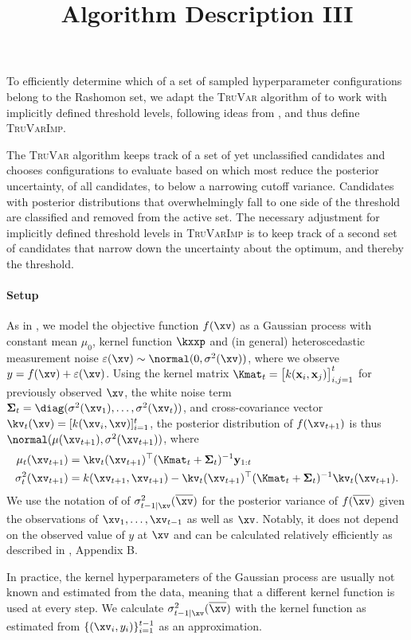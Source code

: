 \documentclass[a4paper,10pt]{article}
\title{Algorithm Description III}
\author{}
\date{}
\newcommand{\TruVar}{\textsc{TruVar}\xspace}
\newcommand{\TruVarImp}{\textsc{TruVarImp}\xspace}
\begin{document}
\maketitle

To efficiently determine which of a set of sampled hyperparameter configurations belong to the Rashomon set, we adapt the \TruVar algorithm of \citet{truvar2024} to work with implicitly defined threshold levels, following ideas from \citet{lse}, and thus define \TruVarImp.

The \TruVar algorithm keeps track of a set of yet unclassified candidates and chooses configurations to evaluate based on which most reduce the posterior uncertainty, of all candidates, to below a narrowing cutoff variance.
Candidates with posterior distributions that overwhelmingly fall to one side of the threshold are classified and removed from the active set.
The necessary adjustment for implicitly defined threshold levels in \TruVarImp is to keep track of a second set of candidates that narrow down the uncertainty about the optimum, and thereby the threshold.

\paragraph{Setup} {
    As in \citet{truvar2024}, we model the objective function $f(\xv)$ as a Gaussian process \citep{rasmussen2006} with constant mean $\mu_0$, kernel function $\kxxp$ and (in general) heteroscedastic measurement noise $\varepsilon(\xv)\sim \normal(0, \sigma^2(\xv))$, where we observe $y=f(\xv)+\varepsilon(\xv)$.
    Using the kernel matrix $\Kmat_t = \bigl[k(\mathbf{x}_i, \mathbf{x}_j)\bigr]_{i,j=1}^t$ for previously observed $\xv$, the white noise term $\mathbf{\Sigma}_t = \diag(\sigma^2(\xv_1),\ldots,\sigma^2(\xv_t))$, and cross-covariance vector $\kv_t(\xv) = [k(\xv_i, \xv)]_{i=1}^t$, the posterior distribution of $f(\xv_{t+1})$ is thus $\normal(\mu(\xv_{t+1}), \sigma^2(\xv_{t+1}))$, where
    \begin{align}
        \mu_t(\xv_{t+1}) &= \kv_t(\xv_{t+1})^\top(\Kmat_t+\mathbf{\Sigma}_t)^{-1}\mathbf{y}_{1:t}\label{eq:mu_update}\\
        \sigma_t^2(\xv_{t+1}) &= k(\xv_{t+1}, \xv_{t+1}) - \kv_t(\xv_{t+1})^\top(\Kmat_t+\mathbf{\Sigma}_t)^{-1}\kv_t(\xv_{t+1})\mathrm{.}\label{eq:sigma_update}
    \end{align}
    We use the notation of \citet{truvar2024} of $\sigma_{t-1|\xv}^2(\overline{\xv})$ for the posterior variance of $f(\overline{\xv})$ given the observations of $\xv_1,\ldots,\xv_{t-1}$ as well as $\xv$.
    Notably, it does not depend on the observed value of $y$ at $\xv$ and can be calculated relatively efficiently as described in \citet{truvar2024}, Appendix B.

    In practice, the kernel hyperparameters of the Gaussian process are usually not known and estimated from the data, meaning that a different kernel function is used at every step.
    We calculate $\sigma_{t-1|\xv}^2(\overline{\xv})$ with the kernel function as estimated from $\{(\xv_i, y_i)\}_{i=1}^{t-1}$ as an approximation.
}
\end{document}
